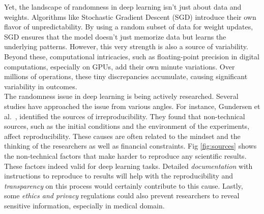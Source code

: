 Yet, the landscape of randomness in deep learning isn't just about data and weights. Algorithms like Stochastic Gradient Descent (SGD) introduce their own flavor of unpredictability. By using a random subset of data for weight updates, SGD ensures that the model doesn't just memorize data but learns the underlying patterns. However, this very strength is also a source of variability.\\

Beyond these, computational intricacies, such as floating-point precision in digital computations, especially on GPUs, add their own minute variations. Over millions of operations, these tiny discrepancies accumulate, causing significant variability in outcomes.\\

The randomness issue in deep learning is being actively researched. 
Several studies have approached the issue from various angles. 
For instance, Gundersen et al.~\cite{gundersen2022sources}, identified the sources of irreproducibility. 
They found that non-technical sources, such as the initial conditions and the environment of the experiments, affect reproducibility. 
These causes are often related to the mindset and the thinking of the researchers as well as financial constraints. Fig \ref{fig:sources} shows
the non-technical factors that make harder to reproduce any scientific results. These factors indeed valid for deep learning tasks.
Detailed \emph{documentation} with instructions to reproduce to results will help with the reproducibility
and \emph{transparency} on this process would certainly contribute to this cause. Lastly, some \emph{ethics and privacy} regulations could also prevent researchers
to reveal sensitive information, especially in medical domain.
\\

